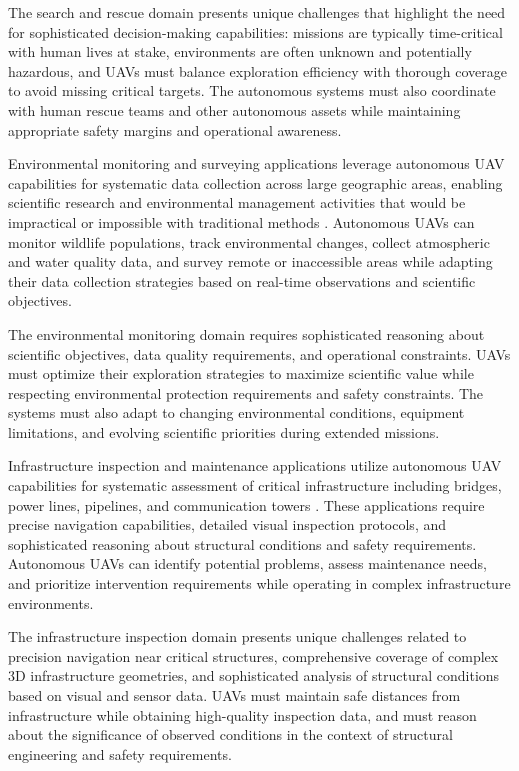 The search and rescue domain presents unique challenges that highlight the need for sophisticated decision-making capabilities: missions are typically time-critical with human lives at stake, environments are often unknown and potentially hazardous, and UAVs must balance exploration efficiency with thorough coverage to avoid missing critical targets. The autonomous systems must also coordinate with human rescue teams and other autonomous assets while maintaining appropriate safety margins and operational awareness.

Environmental monitoring and surveying applications leverage autonomous UAV capabilities for systematic data collection across large geographic areas, enabling scientific research and environmental management activities that would be impractical or impossible with traditional methods \cite{zhang2012unmanned}. Autonomous UAVs can monitor wildlife populations, track environmental changes, collect atmospheric and water quality data, and survey remote or inaccessible areas while adapting their data collection strategies based on real-time observations and scientific objectives.

The environmental monitoring domain requires sophisticated reasoning about scientific objectives, data quality requirements, and operational constraints. UAVs must optimize their exploration strategies to maximize scientific value while respecting environmental protection requirements and safety constraints. The systems must also adapt to changing environmental conditions, equipment limitations, and evolving scientific priorities during extended missions.

Infrastructure inspection and maintenance applications utilize autonomous UAV capabilities for systematic assessment of critical infrastructure including bridges, power lines, pipelines, and communication towers \cite{ham2016visual}. These applications require precise navigation capabilities, detailed visual inspection protocols, and sophisticated reasoning about structural conditions and safety requirements. Autonomous UAVs can identify potential problems, assess maintenance needs, and prioritize intervention requirements while operating in complex infrastructure environments.

The infrastructure inspection domain presents unique challenges related to precision navigation near critical structures, comprehensive coverage of complex 3D infrastructure geometries, and sophisticated analysis of structural conditions based on visual and sensor data. UAVs must maintain safe distances from infrastructure while obtaining high-quality inspection data, and must reason about the significance of observed conditions in the context of structural engineering and safety requirements.

